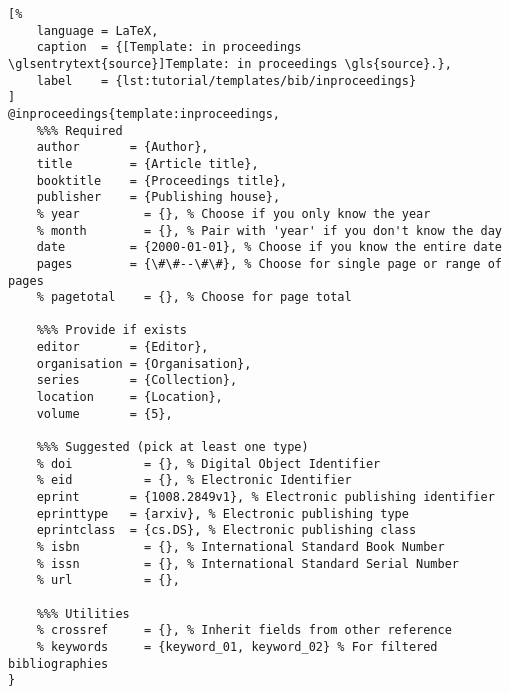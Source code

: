 \newpage
\begin{lstlisting}[%
    language = LaTeX,
    caption  = {[Template: in proceedings \glsentrytext{source}]Template: in proceedings \gls{source}.},
    label    = {lst:tutorial/templates/bib/inproceedings}
]
@inproceedings{template:inproceedings,
    %%% Required
    author       = {Author},
    title        = {Article title},
    booktitle    = {Proceedings title},
    publisher    = {Publishing house},
    % year         = {}, % Choose if you only know the year
    % month        = {}, % Pair with 'year' if you don't know the day
    date         = {2000-01-01}, % Choose if you know the entire date
    pages        = {\#\#--\#\#}, % Choose for single page or range of pages
    % pagetotal    = {}, % Choose for page total
    
    %%% Provide if exists
    editor       = {Editor},
    organisation = {Organisation},
    series       = {Collection},
    location     = {Location},
    volume       = {5},
    
    %%% Suggested (pick at least one type)
    % doi          = {}, % Digital Object Identifier
    % eid          = {}, % Electronic Identifier
    eprint       = {1008.2849v1}, % Electronic publishing identifier
    eprinttype   = {arxiv}, % Electronic publishing type
    eprintclass  = {cs.DS}, % Electronic publishing class
    % isbn         = {}, % International Standard Book Number
    % issn         = {}, % International Standard Serial Number
    % url          = {},
    
    %%% Utilities
    % crossref     = {}, % Inherit fields from other reference
    % keywords     = {keyword_01, keyword_02} % For filtered bibliographies
}
\end{lstlisting}

